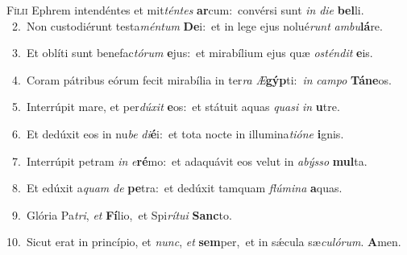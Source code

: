 \lettrine{\initial\textcolor{\initialcolor}{F}}{ílii} Ephrem intendéntes et mit\-\textit{tén}\-\textit{tes} \textbf{ar}\-cum:~\star convérsi sunt \textit{in} \textit{di}\-\textit{e} \textbf{bel}\-li.\\
{\numbfont\textcolor{\numbcolor}{~2.}}~Non custodiérunt testa\-\textit{mén}\-\textit{tum} \textbf{De}\-i:~\star et in lege ejus nolué\textit{runt} \textit{am}\-\textit{bu}\textbf{lá}re.\par
{\numbfont\textcolor{\numbcolor}{~3.}}~Et oblíti sunt benefac\-\textit{tó}\-\textit{rum} \textbf{e}\-jus:~\star et mirabílium ejus quæ \textit{os}\-\textit{tén}\textit{dit} \textbf{e}\-is.\par
{\numbfont\textcolor{\numbcolor}{~4.}}~Coram pátribus eórum fecit mirabília in ter\textit{ra} \textit{Æ}\-\textbf{gýp}ti:~\star \textit{in} \textit{cam}\-\textit{po} \textbf{Tá}\-\textbf{ne}os.\par
{\numbfont\textcolor{\numbcolor}{~5.}}~Interrúpit mare, et per\-\textit{dú}\-\textit{xit} \textbf{e}\-os:~\star et státuit aquas \textit{qua}\-\textit{si} \textit{in} \textbf{u}\-tre.\par
{\numbfont\textcolor{\numbcolor}{~6.}}~Et dedúxit eos in nu\textit{be} \textit{di}\-\textbf{é}i:~\star et tota nocte in illumina\-\textit{ti}\-\textit{ó}\textit{ne} \textbf{i}\-gnis.\par
{\numbfont\textcolor{\numbcolor}{~7.}}~Interrúpit petram \textit{in} \textit{e}\-\textbf{ré}mo:~\star et adaquávit eos velut in \textit{a}\-\textit{býs}\textit{so} \textbf{mul}\-ta.\par
{\numbfont\textcolor{\numbcolor}{~8.}}~Et edúxit a\textit{quam} \textit{de} \textbf{pe}\-tra:~\star et dedúxit tamquam \textit{flú}\-\textit{mi}\textit{na} \textbf{a}\-quas.\par
{\numbfont\textcolor{\numbcolor}{~9.}}~Glória Pa\-\textit{tri}\-, \textit{et} \textbf{Fí}\-lio,~\star et Spi\-\textit{rí}\-\textit{tu}\textit{i} \textbf{Sanc}\-to.\par
{\numbfont\textcolor{\numbcolor}{10.}}~Sicut erat in princípio, et \textit{nunc}\-, \textit{et} \textbf{sem}\-per,~\star et in sǽcula sæ\-\textit{cu}\-\textit{ló}\textit{rum}. \textbf{A}\-men.\par
